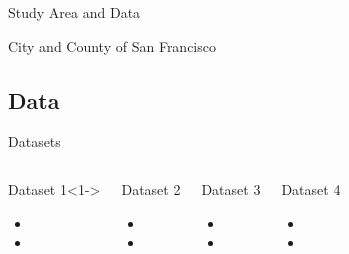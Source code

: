 \documentclass{beamer}
\begin{document}
\begin{section}{Study Area and Data}
\begin{frame}{City and County of San Francisco}
    \end{frame}

    \subsection{Data}                           %
    \begin{frame}{Datasets}
        \begin{columns}
                \begin{block}{Dataset 1}<1->
                    \begin{itemize}
                        \item
                        \item
                    \end{itemize}
                \end{block}
                \begin{block}{Dataset 2}
                    \begin{itemize}
                        \item
                        \item
                    \end{itemize}
                \end{block}

                \begin{block}{Dataset 3}
                    \begin{itemize}
                        \item
                        \item
                    \end{itemize}
                \end{block}
                \begin{block}{Dataset 4}
                    \begin{itemize}
                        \item
                        \item
                    \end{itemize}
                \end{block}
        \end{columns}
    \end{frame}
\end{section}
\end{document}
